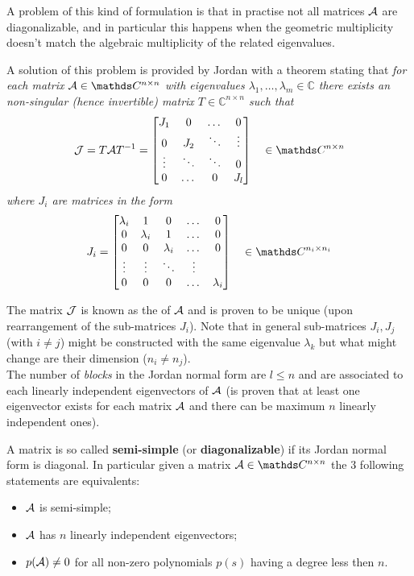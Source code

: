 		A problem of this kind of formulation is that in practise not all matrices $\mathcal{A}$ are diagonalizable, and in particular this happens when the geometric multiplicity doesn't match the algebraic multiplicity of the related eigenvalues.
		
		A solution of this problem is provided by Jordan with a theorem stating that { \itshape for each matrix $\A \in \mathds C^{n\times n}$ with eigenvalues $\lambda_1, \dots, \lambda_m \in \mathds C$ there exists an non-singular (hence invertible) matrix $T \in \mathds C^{n\times n}$ such that
		\begin{equation}
			\J = T \A T^{-1} = \mat{ J_1 & 0 & \dots & 0 \\
				0 & J_2 & \ddots  & \vdots \\ 
				\vdots & \ddots & \ddots & 0 \\
				0 & \dots & 0 & J_l } \quad \in \mathds C^{n\times n} 
		\end{equation} where $J_i$ are matrices in the form
		\begin{equation}
			J_i = \mat{\lambda_i & 1 & 0 & \dots & 0 \\
			0 & \lambda_i & 1 & \dots & 0 \\
			0 & 0 & \lambda_i & \dots & 0 \\
			\vdots & \vdots & \ddots & \vdots \\
			0 & 0 & 0 & \dots & \lambda_i } \quad \in \mathds C^{n_i\times n_i}
		\end{equation} }
	
		The matrix $\mathcal{J}$ is known as the  of $\mathcal{A}$ and is proven to be unique (upon rearrangement of the sub-matrices $J_i$). Note that in general sub-matrices $J_i,J_j$ (with $i\neq j$) might be constructed with the same eigenvalue $\lambda_k$ but what might change are their dimension ($n_i\neq n_j$). \\		
		The number of \textit{blocks} in the Jordan normal form are $l \leq n$ and are associated to each linearly independent eigenvectors of $\mathcal{A}$ (is proven that at least one eigenvector exists for each matrix $\mathcal{A}$ and there can be maximum $n$ linearly independent ones).
		
		A matrix is so called \textbf{semi-simple} (or \textbf{diagonalizable}) if its Jordan normal form is diagonal. In particular given a matrix $\A \in \mathds C^{n\times n}$ the 3 following statements are equivalents:
		\begin{itemize}
			\item $\mathcal{A}$ is semi-simple;
			\item $\mathcal{A}$ has $n$ linearly independent eigenvectors;
			\item $p(\mathcal{A}) \neq 0$ for all non-zero polynomials $p(s)$ having a degree less then $n$.
		\end{itemize}
	
